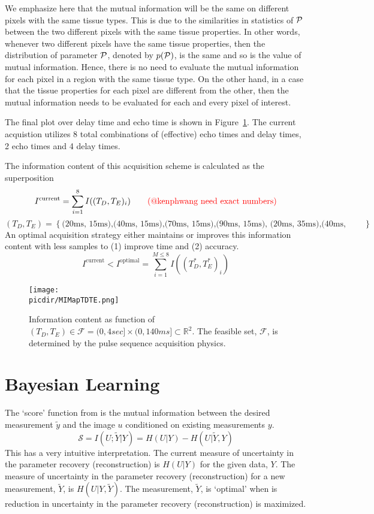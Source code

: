 \documentclass{article}         %
\theoremstyle{definition}
\theoremstyle{remark}
\newcommand{\picdir}{pdffig/}
\begin{document}
We emphasize here that the mutual information will be the same on different pixels with the same tissue types. This is due to the similarities in statistics of $\mathcal{P}$ between the two different pixels with the same tissue properties. In other words, whenever two different pixels have the same tissue properties, then the distribution of parameter $\mathcal{P}$, denoted by $p(\mathcal{P})$, is the same and so is the value of mutual information. Hence, there is no need to evaluate the mutual information for each pixel in a region with the same tissue type. 
On the other hand, in a case that the tissue properties for each pixel are different from the other, then the mutual information needs to be evaluated for each and every pixel of interest.

The final plot over delay time and echo time is shown in Figure~\ref{fig:MIMapTDTE}.
The current acquistion utilizes 8 total combinations of (effective) echo times 
and delay times, 2 echo times and 4 delay times.

The information content of this acquisition scheme is calculated as the superposition
\[
 I^\text{current} = \sum_{i=1}^8 I((T_D, T_E)_i)
\qquad \text{\color{red}(@kenphwang need exact numbers)}
\]
\[
   \left(T_D, T_E\right) = 
   \left\{
   \text{(20ms, 15ms),(40ms, 15ms),(70ms, 15ms),(90ms, 15ms),
         (20ms, 35ms),(40ms, 35ms),(70ms, 35ms),(90ms, 35ms)}
   \right\}
\]
An optimal acquisition strategy either maintains or improves this information content with
less samples to (1) improve time and (2) accuracy.
\[
  I^\text{current} < I^\text{optimal} = \sum_{i=1}^{M \leq 8} I((T^*_D, T^*_E)_i)
\]

\begin{figure}[h] 
\centering
\texttt{[image: \\picdir/MIMapTDTE.png]} 
\caption{ 
Information content as function of $(T_D, T_E) \in \mathcal{F} = (0,4sec] \times (0,140ms] \subset \mathbb{R}^2 $.
The feasible set, $\mathcal{F} $, 
is determined by the pulse sequence acquisition physics.
}\label{fig:MIMapTDTE}
\end{figure}

\section{Bayesian Learning}

The `score' function from 
\cite{seeger2010optimization} is the mutual information between the desired measurement $\tilde{y}$
and the image $u$ conditioned on existing measurements $y$.
\[ 
\mathcal{S}   =  I(U;\tilde{Y}|Y) =  H(U|Y) - H(U|\tilde{Y},Y)   
\]
This has a very intuitive interpretation.  The current measure of uncertainty
in the parameter recovery (reconstruction) is $H(U|Y)$ for the given data, $Y$. 
The measure of uncertainty in the parameter recovery (reconstruction) for
 a new measurement, $\tilde{Y}$, is $H(U|Y,\tilde{Y})$.
The measurement, $\tilde{Y}$, is `optimal' when is reduction
in uncertainty in the parameter recovery (reconstruction) is maximized.
\end{document}
